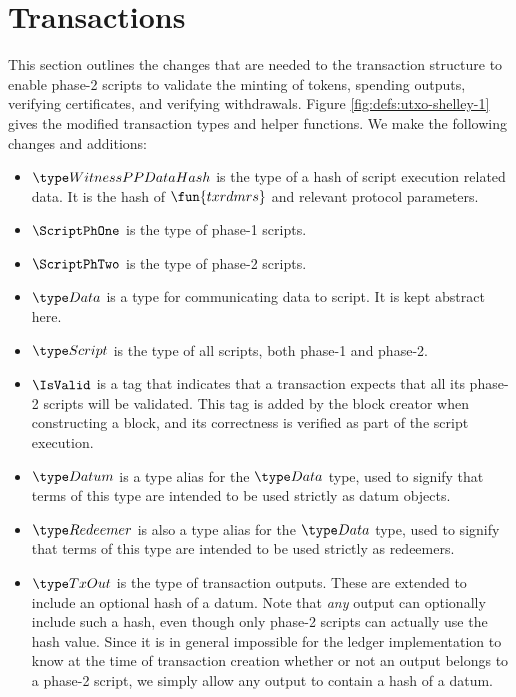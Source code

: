 \section{Transactions}
\label{sec:transactions}

This section outlines the changes that are needed to the transaction
structure to enable phase-2 scripts to validate
the minting of tokens, spending outputs, verifying certificates, and
verifying withdrawals.
%
Figure \ref{fig:defs:utxo-shelley-1} gives the modified transaction types and helper functions.
We make the following changes and additions:

\begin{itemize}
  \item $\WitnessPPDataHash$ is the type of a hash of script execution
  related data. It is the hash of $\fun{txrdmrs}$ and relevant protocol parameters.

  \item $\ScriptPhOne$ is the type of phase-1 scripts.

  \item $\ScriptPhTwo$ is the type of phase-2 scripts.

  \item $\Data$ is a type for communicating data to script.  It is kept abstract here.

  \item $\Script$ is the type of all scripts, both phase-1 and phase-2.

  \item $\IsValid$ is a tag that indicates that a transaction
  expects that all its phase-2 scripts will be validated.
  This tag is added by the block creator when
  constructing a block, and its correctness is verified as part of the script execution.

  \item $\Datum$ is a type alias for the $\Data$ type, used to signify that
  terms of this type are intended to be used strictly as datum objects.

  \item $\Redeemer$ is also a type alias for the $\Data$ type, used to signify that
  terms of this type are intended to be used strictly as redeemers.

  \item $\TxOut$ is the type of transaction outputs. These are extended to include
  an optional hash of a datum. Note that \emph{any} output can
  optionally include such a hash, even though only phase-2 scripts
  can actually use the hash value. Since it is in general impossible for the ledger implementation to
  know at the time of transaction creation whether or not an output belongs to a phase-2
  script, we simply allow any output to contain a hash of a datum.


\end{itemize}
